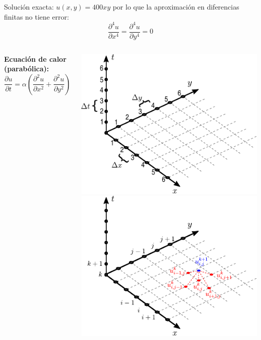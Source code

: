 \documentclass[9pt, aspectratio=169]{beamer}
\begin{document}
\begin{frame}
Solución exacta: $u(x, y) = 400 xy$ por lo que la aproximación en diferencias finitas no tiene error:
\[ \frac{\partial^4 u}{\partial x^4} = \frac{\partial^4 u}{\partial y^4} = 0 \]
\end{frame}

\begin{frame}
    \begin{columns}[t]
\textbf{Ecuación de calor (parabólica):}
\[ \frac{\partial u}{\partial t} = \alpha \left(\frac{\partial^2 u}{\partial x^2} + \frac{\partial^2 u}{\partial y^2}\right) \] \pause
  \begin{center}
  \begin{overprint}
   \includegraphics[width=1.0\textwidth]{figs/grilla}
   \includegraphics[width=1.0\textwidth]{figs/grilla-stencil}
  \end{overprint}
  \end{center}


\end{columns}
\end{frame}
\end{document}

